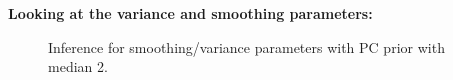 \documentclass{beamer} %
\begin{document}
\begin{frame}
\textbf{Looking at the variance and smoothing parameters:}
\begin{figure}[p]
    \centering
     \caption{Inference for smoothing/variance parameters with PC prior \citep{simpson2017penalising} with median 2.}
    \label{fig:realdata_1990_2}
\end{figure}
\end{frame}
\end{document}
